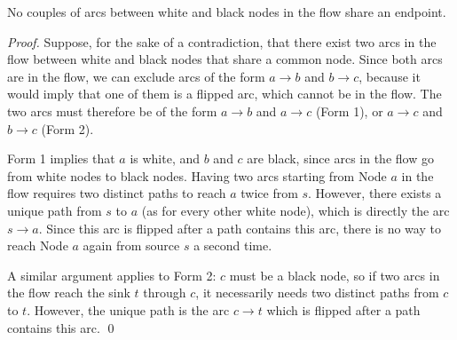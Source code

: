 \documentclass[svgnames,table,runningheads]{llncs}
\begin{document}
\begin{lemma}\label{lem:notwice}
  No couples of arcs between white and black nodes in the flow share an endpoint.
\end{lemma}
\begin{proof}
  Suppose, for the sake of a contradiction, that there exist two arcs in the flow between white and black nodes that share a common node. Since both arcs are in the flow, we can exclude arcs of the form \(a\rightarrow b\) and \(b\rightarrow c\), because it would imply that one of them is a flipped arc, which cannot be in the flow. The two arcs must therefore be of the form \(a\rightarrow b\) and \(a\rightarrow c\) (Form 1), or \(a\rightarrow c\) and \(b\rightarrow c\) (Form 2).

  Form 1 implies that \(a\) is white, and \(b\) and \(c\) are black, since arcs in the flow go from white nodes to black nodes. Having two arcs starting from Node \(a\) in the flow requires two distinct paths to reach \(a\) twice from \(s\). However, there exists a unique path from \(s\) to \(a\) (as for every other white node), which is directly the arc \(s\rightarrow  a\). Since this arc is flipped after a path contains this arc, there is no way to reach Node \(a\) again from source \(s\) a second time.

  A similar argument applies to Form 2: \(c\) must be a black node, so if two arcs in the flow reach the sink \(t\) through \(c\), it necessarily needs two distinct paths from \(c\) to \(t\). However, the unique path is the arc \(c\rightarrow t\) which is flipped after a path contains this arc.
  \qed
\end{proof}
\end{document}
